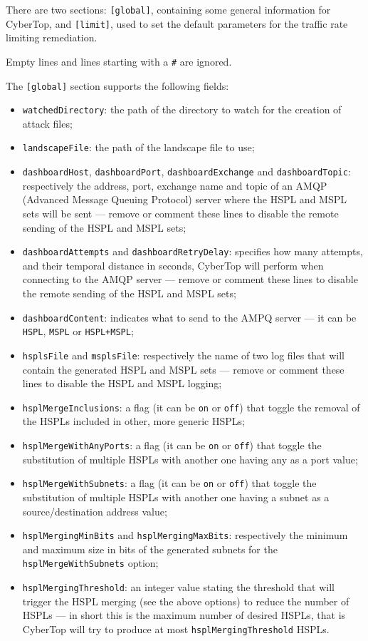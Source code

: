 \documentclass{scrartcl}
\begin{document}
There are two sections: \lstinline|[global]|, containing some general information for CyberTop, and \lstinline|[limit]|, used to set the default parameters for the traffic rate limiting remediation.

Empty lines and lines starting with a \lstinline|#| are ignored.

The \lstinline|[global]| section supports the following fields:

\begin{itemize}
	\item \lstinline|watchedDirectory|: the path of the directory to watch for the creation of attack files;
	\item \lstinline|landscapeFile|: the path of the landscape file to use;
	\item \lstinline|dashboardHost|, \lstinline|dashboardPort|, \lstinline|dashboardExchange| and \lstinline|dashboardTopic|: respectively the address, port, exchange name and topic of an AMQP (Advanced Message Queuing Protocol) server where the HSPL and MSPL sets will be sent --- remove or comment these lines to disable the remote sending of the HSPL and MSPL sets;
	\item \lstinline|dashboardAttempts| and \lstinline|dashboardRetryDelay|: specifies how many attempts, and their temporal distance in seconds, CyberTop will perform when connecting to the AMQP server --- remove or comment these lines to disable the remote sending of the HSPL and MSPL sets;
	\item \lstinline|dashboardContent|: indicates what to send to the AMPQ server --- it can be \lstinline|HSPL|, \lstinline|MSPL| or \lstinline|HSPL+MSPL|;
	\item \lstinline|hsplsFile| and \lstinline|msplsFile|: respectively the name of two log files that will contain the generated HSPL and MSPL sets --- remove or comment these lines to disable the HSPL and MSPL logging;
	\item \lstinline|hsplMergeInclusions|: a flag (it can be \lstinline|on| or \lstinline|off|) that toggle the removal of the HSPLs included in other, more generic HSPLs;
	\item \lstinline|hsplMergeWithAnyPorts|: a flag (it can be \lstinline|on| or \lstinline|off|) that toggle the substitution of multiple HSPLs with another one having any as a port value;
	\item \lstinline|hsplMergeWithSubnets|: a flag (it can be \lstinline|on| or \lstinline|off|) that toggle the substitution of multiple HSPLs with another one having a subnet as a source/destination address value;
	\item \lstinline|hsplMergingMinBits| and \lstinline|hsplMergingMaxBits|: respectively the minimum and maximum size in bits of the generated subnets for the \lstinline|hsplMergeWithSubnets| option;
	\item \lstinline|hsplMergingThreshold|: an integer value stating the threshold that will trigger the HSPL merging (see the above options) to reduce the number of HSPLs --- in short this is the maximum number of desired HSPLs, that is CyberTop will try to produce at most \lstinline|hsplMergingThreshold| HSPLs.
\end{itemize}
\end{document}
